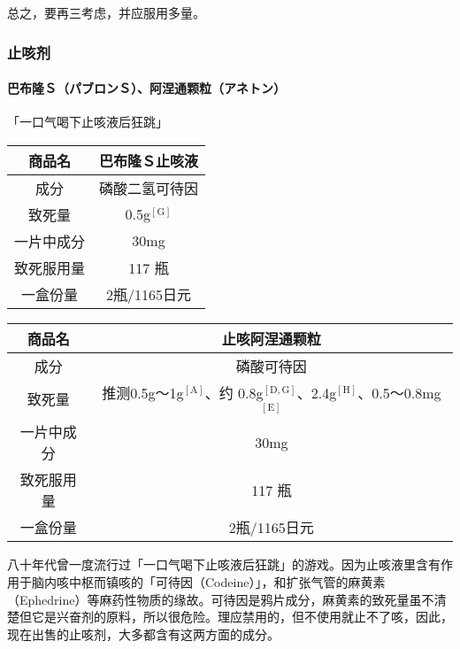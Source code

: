 \documentclass[UTF8]{ctexart}
\begin{document}
总之，要再三考虑，并应服用多量。

\subsubsection*{止咳剂}

\paragraph*{巴布隆Ｓ（パブロンＳ）、阿涅通颗粒（アネトン）}

\begin{flushright}
「一口气喝下止咳液后狂跳」
\end{flushright}

\begin{table}[htbp]
\begin{center}
\begin{tabular}{cc}

\toprule
商品名 & 巴布隆Ｓ止咳液 \\
\midrule
成分 & 磷酸二氢可待因 \\
致死量 & 0.5g$^\mathrm{[G]}$ \\
一片中成分 & 30mg \\
致死服用量 & 117 瓶 \\
一盒份量 & 2瓶/1165日元 \\
\bottomrule
\end{tabular}
\end{center}
\end{table}

\begin{table}[htbp]
\begin{center}
\begin{tabular}{cc}

\toprule
商品名 & 止咳阿涅通颗粒 \\
\midrule
成分 & 磷酸可待因 \\
致死量 & 推测0.5g～1g$^\mathrm{[A]}$、约 0.8g$^\mathrm{[D,G]}$、2.4g$^\mathrm{[H]}$、0.5～0.8mg$^\mathrm{[E]}$ \\
一片中成分 & 30mg \\
致死服用量 & 117 瓶 \\
一盒份量 & 2瓶/1165日元 \\
\bottomrule
\end{tabular}
\end{center}
\end{table}

八十年代曾一度流行过「一口气喝下止咳液后狂跳」的游戏。因为止咳液里含有作用于脑内咳中枢而镇咳的「可待因（Codeine）」，和扩张气管的麻黄素（Ephedrine）等麻药性物质的缘故。可待因是鸦片成分，麻黄素的致死量虽不清楚但它是兴奋剂的原料，所以很危险。理应禁用的，但不使用就止不了咳，因此，现在出售的止咳剂，大多都含有这两方面的成分。
\end{document}
